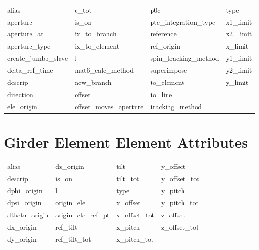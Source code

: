  \begin{tabular}{llll} \toprule
alias                       & e_tot                       & p0c                         & type                        \\
aperture                    & is_on                       & ptc_integration_type        & x1_limit                    \\
aperture_at                 & ix_to_branch                & reference                   & x2_limit                    \\
aperture_type               & ix_to_element               & ref_origin                  & x_limit                     \\
create_jumbo_slave          & l                           & spin_tracking_method        & y1_limit                    \\
delta_ref_time              & mat6_calc_method            & superimpose                 & y2_limit                    \\
descrip                     & new_branch                  & to_element                  & y_limit                     \\
direction                   & offset                      & to_line                     &                             \\
ele_origin                  & offset_moves_aperture       & tracking_method             &                             \\
 \bottomrule
 \end{tabular}
 \vfill
 
 \section{Girder Element Element Attributes}
 \label{s:list.girder}
 
 \begin{tabular}{llll} \toprule
alias                       & dz_origin                   & tilt                        & y_offset                    \\
descrip                     & is_on                       & tilt_tot                    & y_offset_tot                \\
dphi_origin                 & l                           & type                        & y_pitch                     \\
dpsi_origin                 & origin_ele                  & x_offset                    & y_pitch_tot                 \\
dtheta_origin               & origin_ele_ref_pt           & x_offset_tot                & z_offset                    \\
dx_origin                   & ref_tilt                    & x_pitch                     & z_offset_tot                \\
dy_origin                   & ref_tilt_tot                & x_pitch_tot                 &                             \\
 \bottomrule
 \end{tabular}
 \vfill
 
